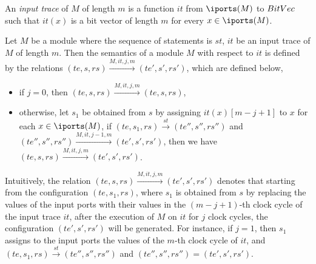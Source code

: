 

An \emph{input trace} of $M$ of length $m$ is a function $it$ from $\iports(M)$ to $BitVec$ such that $it(x)$ is a bit vector of length $m$ for every $x \in \iports(M)$.

Let $M$ be a module where the sequence of statements is $st$, $it$  be an input trace of $M$ of length $m$. Then the semantics of a module $M$ with respect to $it$ is defined by the relations $(te, s, rs) \xrightarrow{M, it, j, m} (te', s', rs')$, which are defined below,
\begin{itemize}
\item if $j = 0$, then $(te, s, rs) \xrightarrow{M, it, j, m} (te, s, rs)$, 
%
\item otherwise, let $s_1$ be obtained from $s$ by assigning $it(x)[m-j+1]$ to $x$ for each $x \in \iports(M)$, if $(te, s_1, rs) \xrightarrow{st} (te'', s'', rs'')$ and $(te'', s'', rs'') \xrightarrow{M, it, j-1, m} (te', s', rs')$, then we have $(te, s, rs) \xrightarrow{M, it, j, m} (te', s', rs')$.
\end{itemize}
Intuitively, the relation $(te, s, rs) \xrightarrow{M, it, j, m} (te', s', rs')$ denotes that starting from the configuration $(te, s_1, rs)$, where $s_1$ is obtained from $s$ by replacing the values of the input ports with their values in the $(m-j+1)$-th clock cycle of the input trace $it$, after the execution of $M$ on $it$ for $j$ clock cycles, the configuration $(te', s', rs')$ will be generated. For instance, if $j=1$, then $s_1$ assigns to the input ports the values of the $m$-th clock cycle of $it$, and $(te, s_1, rs) \xrightarrow{st} (te'', s'', rs'')$ and $(te'', s'', rs'') = (te', s', rs')$.
